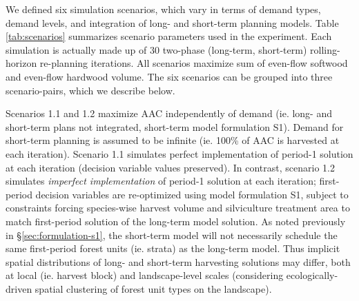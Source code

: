 
We defined six simulation scenarios, which vary in terms of demand
types, demand levels, and integration of long- and short-term planning
models. Table \ref{tab:scenarios} summarizes scenario parameters used
in the experiment. Each simulation is actually made up of 30 two-phase
(long-term, short-term) rolling-horizon re-planning iterations. All
scenarios maximize sum of even-flow softwood and even-flow hardwood
volume. The six scenarios can be grouped into three scenario-pairs,
which we describe below.


Scenarios 1.1 and 1.2 maximize AAC independently of demand (ie. long-
and short-term plans not integrated, short-term model formulation
S1). Demand for short-term planning is assumed to be infinite
(ie. 100\% of AAC is harvested at each iteration). Scenario 1.1
simulates perfect implementation of period-1 solution at each
iteration (decision variable values preserved). In contrast, scenario
1.2 simulates \emph{imperfect implementation} of period-1 solution at
each iteration; first-period decision variables are re-optimized using
model formulation S1, subject to constraints forcing species-wise harvest
volume and silviculture treatment area to match first-period solution of the
long-term model solution. As noted previously in
\S\ref{sec:formulation-s1}, the short-term model will not
necessarily schedule the same first-period forest units (ie. strata)
as the long-term model. Thus implicit spatial distributions of long-
and short-term harvesting solutions may differ, both at
local (ie. harvest block) and landscape-level scales (considering
ecologically-driven spatial clustering of forest unit types on the
landscape).

